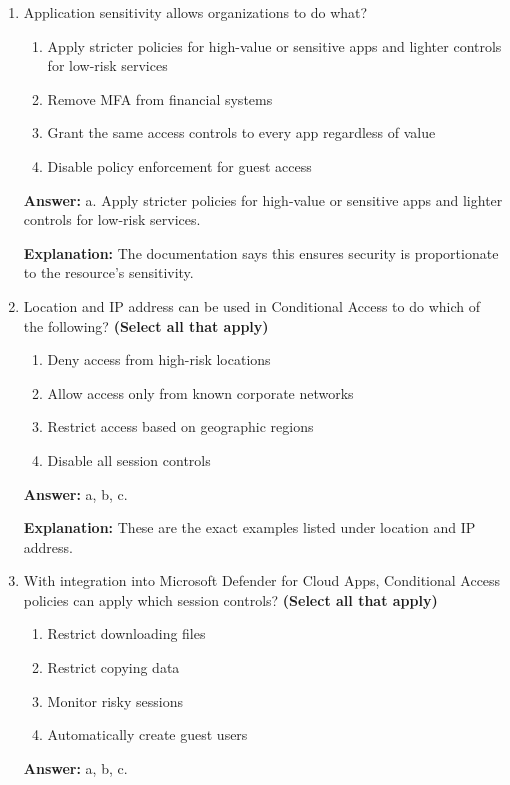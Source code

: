 \documentclass[10pt]{article}
\begin{document}
\begin{enumerate}[leftmargin=*]
\textbf{Explanation:} These are the examples given for device compliance and state.

\item Application sensitivity allows organizations to do what?
\begin{enumerate}[label=\alph*., leftmargin=1.5em]
\item Apply stricter policies for high-value or sensitive apps and lighter controls for low-risk services
\item Remove MFA from financial systems
\item Grant the same access controls to every app regardless of value
\item Disable policy enforcement for guest access
\end{enumerate}
\textbf{Answer:} a. Apply stricter policies for high-value or sensitive apps and lighter controls for low-risk services.

\textbf{Explanation:} The documentation says this ensures security is proportionate to the resource’s sensitivity.

\item Location and IP address can be used in Conditional Access to do which of the following? \textbf{(Select all that apply)}
\begin{enumerate}[label=\alph*., leftmargin=1.5em]
\item Deny access from high-risk locations
\item Allow access only from known corporate networks
\item Restrict access based on geographic regions
\item Disable all session controls
\end{enumerate}
\textbf{Answer:} a, b, c.

\textbf{Explanation:} These are the exact examples listed under location and IP address.

\item With integration into Microsoft Defender for Cloud Apps, Conditional Access policies can apply which session controls? \textbf{(Select all that apply)}
\begin{enumerate}[label=\alph*., leftmargin=1.5em]
\item Restrict downloading files
\item Restrict copying data
\item Monitor risky sessions
\item Automatically create guest users
\end{enumerate}
\textbf{Answer:} a, b, c.


\end{enumerate}
\end{document}
